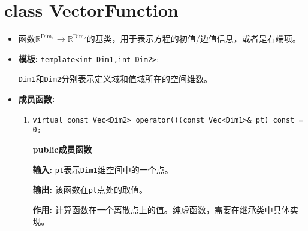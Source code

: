 \documentclass[UTF8]{ctexart}
\theoremstyle{plain}
\theoremstyle{definition}
\theoremstyle{remark}
\begin{document}
\section{class VectorFunction}
\begin{itemize}
    \item 函数$\mathbb{R}^{\text{Dim}_{1}}\rightarrow\mathbb{R}^{\text{Dim}_{2}}$的基类，用于表示方程的初值/边值信息，或者是右端项。
    \item \textbf{模板:} \texttt{template<int Dim1,int Dim2>}:
    
    \texttt{Dim1}和\texttt{Dim2}分别表示定义域和值域所在的空间维数。
    \item \textbf{成员函数:}
    \begin{enumerate}
    \item \texttt{virtual const Vec<Dim2> operator()(const Vec<Dim1>\& pt) const = 0;}

      \textbf{public成员函数}

      \textbf{输入:} \texttt{pt}表示\texttt{Dim1}维空间中的一个点。

      \textbf{输出:} 该函数在\texttt{pt}点处的取值。

      \textbf{作用:} 计算函数在一个离散点上的值。纯虚函数，需要在继承类中具体实现。
    \end{enumerate}
\end{itemize}
\end{document}
